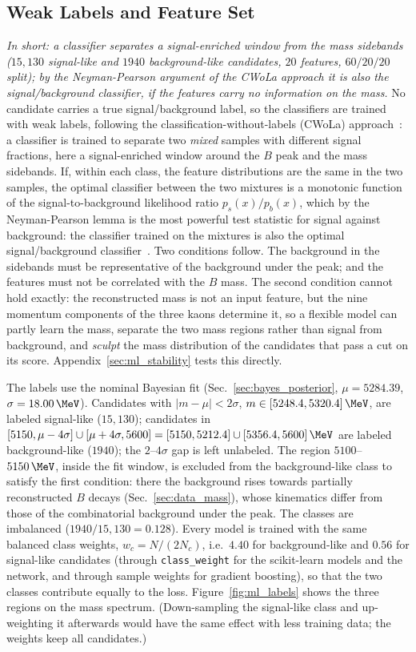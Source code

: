 \subsection{Weak Labels and Feature Set}
\label{sec:ml_labels}
\emph{In short: a classifier separates a signal-enriched window from the mass sidebands ($15{,}130$ signal-like and $1940$ background-like candidates, $20$ features, $60/20/20$ split); by the Neyman-Pearson argument of the CWoLa approach it is also the signal/background classifier, if the features carry no information on the mass.}
No candidate carries a true signal/background label, so the classifiers are trained with weak labels, following the classification-without-labels (CWoLa) approach~\cite{cwola}: a classifier is trained to separate two \emph{mixed} samples with different signal fractions, here a signal-enriched window around the $B$ peak and the mass sidebands. If, within each class, the feature distributions are the same in the two samples, the optimal classifier between the two mixtures is a monotonic function of the signal-to-background likelihood ratio $p_s(x)/p_b(x)$, which by the Neyman-Pearson lemma is the most powerful test statistic for signal against background: the classifier trained on the mixtures is also the optimal signal/background classifier~\cite{cwola}. Two conditions follow. The background in the sidebands must be representative of the background under the peak; and the features must not be correlated with the $B$ mass. The second condition cannot hold exactly: the reconstructed mass is not an input feature, but the nine momentum components of the three kaons determine it, so a flexible model can partly learn the mass, separate the two mass regions rather than signal from background, and \emph{sculpt} the mass distribution of the candidates that pass a cut on its score. Appendix~\ref{sec:ml_stability} tests this directly.

The labels use the nominal Bayesian fit (Sec.~\ref{sec:bayes_posterior}, $\mu=5284.39$, $\sigma=18.00\,\MeV$). Candidates with $|m-\mu|<2\sigma$, $m\in[5248.4,5320.4]\,\MeV$, are labeled signal-like ($15{,}130$); candidates in $[5150,\mu-4\sigma]\cup[\mu+4\sigma,5600]=[5150,5212.4]\cup[5356.4,5600]\,\MeV$ are labeled background-like ($1940$); the $2$--$4\sigma$ gap is left unlabeled. The region $5100$--$5150\,\MeV$, inside the fit window, is excluded from the background-like class to satisfy the first condition: there the background rises towards partially reconstructed $B$ decays (Sec.~\ref{sec:data_mass}), whose kinematics differ from those of the combinatorial background under the peak. The classes are imbalanced ($1940/15{,}130=0.128$). Every model is trained with the same balanced class weights, $w_c=N/(2N_c)$, i.e.\ $4.40$ for background-like and $0.56$ for signal-like candidates (through \texttt{class\_weight} for the scikit-learn models and the network, and through sample weights for gradient boosting), so that the two classes contribute equally to the loss. Figure~\ref{fig:ml_labels} shows the three regions on the mass spectrum. (Down-sampling the signal-like class and up-weighting it afterwards would have the same effect with less training data; the weights keep all candidates.)

